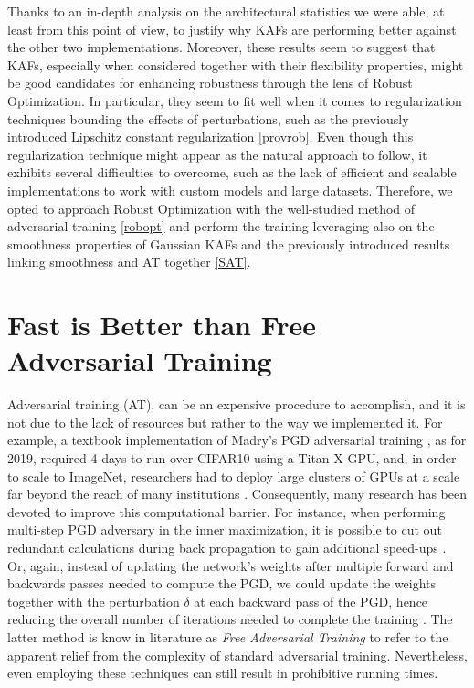 \documentclass[LaM,binding=0.6cm]{./packages/sapthesis/sapthesis}
\begin{document}
        Thanks to an in-depth analysis on the architectural statistics we were able, at least from this point of view, to justify why KAFs are performing better 
        against the other two implementations. Moreover, these results seem to suggest that KAFs, especially when considered together with their flexibility 
        properties, might be good candidates for enhancing robustness through the lens of Robust Optimization. In particular, they seem to fit well when it 
        comes to regularization techniques bounding the effects of perturbations, such as the previously introduced Lipschitz constant regularization \ref{provrob}.
        Even though this regularization technique might appear as the natural approach to follow, it exhibits several difficulties to overcome, such as the lack 
        of efficient and scalable implementations to work with custom models and large datasets. Therefore, we opted to approach Robust Optimization with 
        the well-studied method of adversarial training \ref{robopt} and perform the training leveraging also on the smoothness properties of Gaussian KAFs 
        and the previously introduced results linking smoothness and AT together \ref{SAT}.  

    \section{Fast is Better than Free Adversarial Training}
    \label{fbf}
        Adversarial training (AT), can be an expensive procedure to accomplish, and it is not due to the lack of resources but rather to the way we
        implemented it. For example, a textbook implementation of Madry's PGD adversarial training \cite{madry_adv_training}, as for 2019, required 4 days to run over 
        CIFAR10 using a Titan X GPU, and, in order to scale to ImageNet, researchers had to deploy large clusters of GPUs at a scale far beyond the reach of many 
        institutions \cite{free_adv_train}. Consequently, many research has been devoted to improve this computational barrier. For 
        instance, when performing multi-step PGD adversary in the inner maximization, it is possible to cut out redundant calculations during back 
        propagation to gain additional speed-ups \cite{zhang2019defense}. Or, again, instead of updating the network's weights after multiple 
        forward and backwards passes needed to compute the PGD, we could update the weights together with the perturbation $\delta$ at each 
        backward pass of the PGD, hence reducing the overall number of iterations needed to complete the training \cite{free_adv_train}.
        The latter method is know in literature as \textit{Free Adversarial Training} to refer to the apparent relief from the complexity of standard adversarial
        training.
        Nevertheless, even employing these techniques can still result in prohibitive running times.
        
\end{document}
